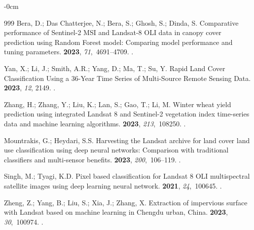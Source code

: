 \documentclass[coasts,article,accept,pdftex,oneauthor]{Definitions/mdpi}
\begin{document}
\begin{adjustwidth}{-\extralength}{0cm}
\begin{thebibliography}{999}
Bera, D.; {Das Chatterjee}, N.; Bera, S.; Ghosh, S.; Dinda, S.
\newblock Comparative performance of Sentinel-2 MSI and Landsat-8 OLI data in
  canopy cover prediction using Random Forest model: Comparing model
  performance and tuning parameters.
 {\bf 2023}, {\em 71},~4691--4709.
.

Yan, X.; Li, J.; Smith, A.R.; Yang, D.; Ma, T.; Su, Y.
\newblock Rapid Land Cover Classification Using a 36-Year Time Series of
  Multi-Source Remote Sensing Data.
 {\bf 2023}, {\em 12}, 2149.
.

Zhang, H.; Zhang, Y.; Liu, K.; Lan, S.; Gao, T.; Li, M.
\newblock Winter wheat yield prediction using integrated Landsat 8 and
  Sentinel-2 vegetation index time-series data and machine learning algorithms.
 {\bf 2023}, {\em
  213},~108250.
.

Mountrakis, G.; Heydari, S.S.
\newblock Harvesting the Landsat archive for land cover land use classification
  using deep neural networks: Comparison with traditional classifiers and
  multi-sensor benefits.
 {\bf 2023},
  {\em 200},~106--119.
.

Singh, M.; Tyagi, K.D.
\newblock Pixel based classification for Landsat 8 OLI multispectral satellite
  images using deep learning neural network.
 {\bf
  2021}, {\em 24},~100645.
.

Zheng, Z.; Yang, B.; Liu, S.; Xia, J.; Zhang, X.
\newblock Extraction of impervious surface with Landsat based on machine
  learning in Chengdu urban, China.
 {\bf
  2023}, {\em 30},~100974.
.


\end{thebibliography}
\end{adjustwidth}
\end{document}
